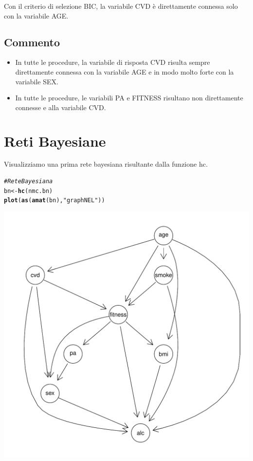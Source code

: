 \documentclass{article}\usepackage[]{graphicx}\usepackage[]{xcolor}
\makeatletter
\def\maxwidth{ %
  \ifdim\Gin@nat@width>\linewidth
    \linewidth
  \else
    \Gin@nat@width
  \fi
}
\newcommand{\hlstr}[1]{\textcolor[rgb]{0.192,0.494,0.8}{#1}}%
\newcommand{\hlcom}[1]{\textcolor[rgb]{0.678,0.584,0.686}{\textit{#1}}}%
\newcommand{\hlstd}[1]{\textcolor[rgb]{0.345,0.345,0.345}{#1}}%
\newcommand{\hlkwb}[1]{\textcolor[rgb]{0.69,0.353,0.396}{#1}}%
\newcommand{\hlkwd}[1]{\textcolor[rgb]{0.737,0.353,0.396}{\textbf{#1}}}%
\newenvironment{kframe}{%
 \def\at@end@of@kframe{}%
 \ifinner\ifhmode%
  \def\at@end@of@kframe{\end{minipage}}%
  \begin{minipage}{\columnwidth}%
 \fi\fi%
 \def\FrameCommand##1{\hskip\@totalleftmargin \hskip-\fboxsep
 \colorbox{shadecolor}{##1}\hskip-\fboxsep
     \hskip-\linewidth \hskip-\@totalleftmargin \hskip\columnwidth}%
 \MakeFramed {\advance\hsize-\width
   \@totalleftmargin\z@ \linewidth\hsize
   \@setminipage}}%
 {\par\unskip\endMakeFramed%
 \at@end@of@kframe}
\newenvironment{knitrout}{}{} %
\makeatother
\begin{document}
      Con il criterio di selezione BIC, la variabile CVD è direttamente connessa
      solo con la variabile AGE.
      
  \subsection{Commento}
    \begin{itemize}
      \item In tutte le procedure, la variabile di risposta CVD risulta
            sempre direttamente connessa con la variabile AGE e in modo molto
            forte con la variabile SEX.
      \item In tutte le procedure, le variabili PA e FITNESS risultano
            non direttamente connesse e alla variabile CVD.
    \end{itemize}
    
\clearpage




\section{Reti Bayesiane}
  Visualizziamo una prima rete bayesiana risultante dalla funzione hc. 
\begin{knitrout}
\color{fgcolor}\begin{kframe}
\begin{alltt}
\hlcom{#Rete Bayesiana}
\hlstd{bn} \hlkwb{<-} \hlkwd{hc}\hlstd{(nmc.bn)}
\hlkwd{plot}\hlstd{(}\hlkwd{as}\hlstd{(}\hlkwd{amat}\hlstd{(bn),} \hlstr{"graphNEL"}\hlstd{))}
\end{alltt}
\end{kframe}
\includegraphics[width=\maxwidth]{figure/Rete_Bayesiana-1} 
\end{knitrout}
  
\end{document}
